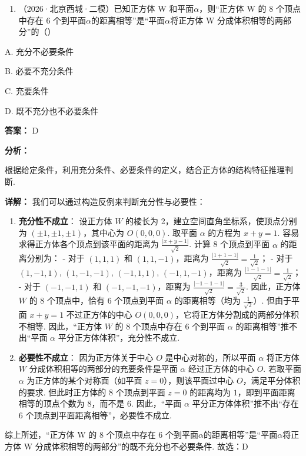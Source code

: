 \documentclass[11pt,a4paper]{ctexart}
\begin{document}
\begin{enumerate}[label=\arabic*., leftmargin=*, start=2]
\item （2026·北京西城·二模）已知正方体 W 和平面\(\alpha\)，则``正方体 W 的 8
  个顶点中存在 6
  个到平面\(\alpha\)的距离相等''是``平面\(\alpha\)将正方体 W
  分成体积相等的两部分''的（）
\end{enumerate}

A. 充分不必要条件

B. 必要不充分条件

C. 充要条件

D. 既不充分也不必要条件

\textbf{答案：}
D

\textbf{分析：}

根据给定条件，利用充分条件、必要条件的定义，结合正方体的结构特征推理判断.

\textbf{详解：}
我们可以通过构造反例来判断充分性与必要性：

\begin{enumerate}[label=(\arabic*), leftmargin=*]
  \item \textbf{充分性不成立}：
  设正方体 $W$ 的棱长为 2，建立空间直角坐标系，使顶点分别为 $(\pm 1, \pm 1, \pm 1)$，其中心为 $O(0, 0, 0)$.
  取平面 $\alpha$ 的方程为 $x + y = 1$. 容易求得正方体各个顶点到该平面的距离为 $\frac{|x + y - 1|}{\sqrt{2}}$.
  计算 8 个顶点到平面 $\alpha$ 的距离分别为：
  - 对于 $(1, 1, 1)$ 和 $(1, 1, -1)$，距离为 $\frac{|1 + 1 - 1|}{\sqrt{2}} = \frac{1}{\sqrt{2}}$；
  - 对于 $(1, -1, 1)$, $(1, -1, -1)$, $(-1, 1, 1)$, $(-1, 1, -1)$，距离为 $\frac{|1 - 1 - 1|}{\sqrt{2}} = \frac{1}{\sqrt{2}}$；
  - 对于 $(-1, -1, 1)$ 和 $(-1, -1, -1)$，距离为 $\frac{|-1 - 1 - 1|}{\sqrt{2}} = \frac{3}{\sqrt{2}}$.
  因此，正方体 $W$ 的 8 个顶点中，恰有 6 个顶点到平面 $\alpha$ 的距离相等（均为 $\frac{1}{\sqrt{2}}$）.
  但由于平面 $x + y = 1$ 不过正方体的中心 $O(0, 0, 0)$，它将正方体分割成的两部分体积不相等. 
  因此，“正方体 $W$ 的 8 个顶点中存在 6 个到平面 $\alpha$ 的距离相等”推不出“平面 $\alpha$ 平分正方体体积”，充分性不成立.

  \item \textbf{必要性不成立}：
  因为正方体关于中心 $O$ 是中心对称的，所以平面 $\alpha$ 将正方体 $W$ 分成体积相等的两部分的充要条件是平面 $\alpha$ 经过正方体的中心 $O$.
  若取平面 $\alpha$ 为正方体的某个对称面（如平面 $z = 0$），则该平面过中心 $O$，满足平分体积的要求.
  但此时正方体的 8 个顶点到平面 $z = 0$ 的距离均为 $1$，即到平面距离相等的顶点个数为 8，而不是 6.
  因此，“平面 $\alpha$ 平分正方体体积”推不出“存在 6 个顶点到平面距离相等”，必要性不成立.
\end{enumerate}
综上所述，“正方体 W 的 8 个顶点中存在 6 个到平面\(\alpha\)的距离相等”是“平面\(\alpha\)将正方体 W 分成体积相等的两部分”的既不充分也不必要条件.
故选：D
\end{document}
